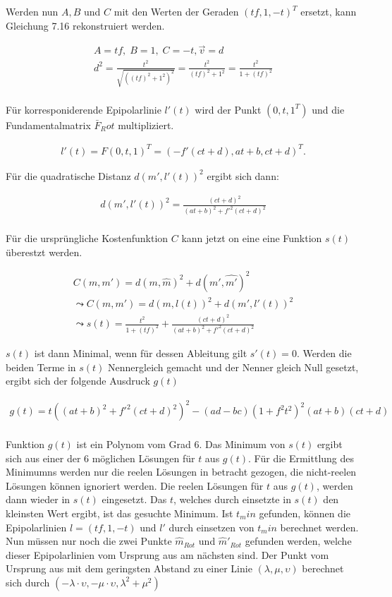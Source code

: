Werden nun $A,B$ und $C$ mit den Werten der Geraden $(tf,1,-t)^T$ ersetzt, kann Gleichung 7.16 rekonstruiert werden.

\begin{gather}
	A = tf, \; B= 1, \; C = -t, \vec{v} = d\\
	d^2 = \frac{t^2}{\sqrt{((tf)^2+1^2)^2}} = \frac{t^2}{(tf)^2+ 1^2} =  \frac{t^2}{1 + (tf)^2}
\end{gather}\\

Für korresponiderende Epipolarlinie $l'(t)$ wird der Punkt $(0,t,1^T)$ und die Fundamentalmatrix $\bar{F}_Rot$ multipliziert.

\begin{gather}
	l'(t) = F(0,t,1)^T = (-f'(ct+d),at+b,ct+d)^T.
\end{gather}

Für die quadratische Distanz $d(m',l'(t))^2$ ergibt sich dann:

\begin{gather}
	d(m',l'(t))^2 = \frac{(ct + d)^2}{(at+b)^2+f'^2(ct+d)^2}
\end{gather} \\

Für die ursprüngliche Kostenfunktion $C$ kann jetzt on eine eine Funktion $s(t)$ überestzt werden.

\begin{gather}
	C(m,m') = d(m,\hat{m})^2 + d(m',\hat{m'})^2 \\
	\leadsto 	C(m,m') = d(m,l(t))^2 + d(m',l'(t))^2\\
	\leadsto s(t) = \frac{t^2}{1+(tf)^2} + \frac{(ct + d)^2}{(at+b)^2+f'^2(ct+d)^2}
\end{gather}

$s(t)$ ist dann Minimal, wenn für dessen Ableitung gilt $s'(t) = 0$. Werden die beiden Terme in $s(t)$ Nennergleich gemacht und der Nenner gleich Null gesetzt, ergibt sich der folgende Ausdruck $g(t)$

\begin{gather}
	g(t) = t((at+b)^2+f'^2(ct+d)^2)^2-(ad-bc)(1+f^2t^2)^2(at+b)(ct+d)
\end{gather}\\

Funktion $g(t)$ ist ein Polynom vom Grad 6. Das Minimum von $s(t)$ ergibt sich aus einer der 6 möglichen Lösungen für $t$ aus $g(t)$. Für die Ermittlung des Minimumns werden nur die reelen Lösungen in betracht gezogen, die nicht-reelen Lösungen können ignoriert werden. Die reelen Lösungen für $t$ aus $g(t)$, werden dann wieder in $s(t)$ eingesetzt. Das $t$, welches durch einsetzte in $s(t)$ den kleinsten Wert ergibt, ist das gesuchte Minimum. Ist $t_min$ gefunden, können die Epipolarlinien $l =(tf,1,-t)$ und $l'$ durch einsetzen von $t_min$ berechnet werden. Nun müssen nur noch die zwei Punkte $\hat{m}_{Rot}$ und $\hat{m}'_{Rot}$ gefunden werden, welche dieser Epipolarlinien vom Ursprung aus am nächsten sind. Der Punkt vom Ursprung aus mit dem geringsten Abstand zu einer Linie $(\lambda, \mu,\upsilon)$ berechnet sich durch $(-\lambda \cdot \upsilon, -\mu \cdot \upsilon, \lambda^2+ \mu^2)$

